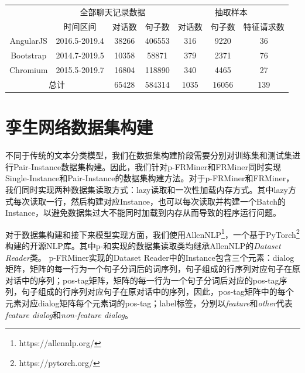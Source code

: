 \begin{table}[htbp]
    \label{tab:dataset}
    \centering
    \footnotesize%
    \setlength{\tabcolsep}{4pt}%
    \renewcommand{\arraystretch}{1.2}%
\begin{tabular}{|c|c|c|c|c|c|c|}
\hline
\multirow{}{}{} & \multicolumn{3}{c|}{全部聊天记录数据}    & \multicolumn{3}{c|}{抽取样本} \\ \cline{2-7} 
                  & 时间区间          & 对话数   & 句子数    & 对话数    & 句子数     & 特征请求数  \\ \hline
AngularJS         & 2016.5-2019.4 & 38266 & 406553 & 316    & 9220    & 36     \\ \hline
Bootstrap         & 2014.7-2019.5 & 10358 & 58871  & 379    & 2371    & 76     \\ \hline
Chromium          & 2015.5-2019.7 & 16804 & 118890 & 340    & 4465    & 27     \\ \hline
\multicolumn{2}{|c|}{总计}          & 65428 & 584314 & 1035   & 16056   & 139    \\ \hline
\end{tabular}
\end{table}
\section{孪生网络数据集构建}

不同于传统的文本分类模型，我们在数据集构建阶段需要分别对训练集和测试集进行Pair-Instance数据集构建。因此，我们针对p-FRMiner和FRMiner同时实现Single-Instance和Pair-Instance的数据集构建方法。对于p-FRMiner和FRMiner，我们同时实现两种数据集读取方式：lazy读取和一次性加载内存方式。其中lazy方式每次读取一行，然后构建对应Instance，也可以每次读取并构建一个Batch的Instance，以避免数据集过大不能同时加载到内存从而导致的程序运行问题。

对于数据集构建和接下来模型实现方面，我们使用AllenNLP\footnote{https://allennlp.org/}，一个基于PyTorch\footnote{https://pytorch.org/}构建的开源NLP库。其中p-{\tool}和{\tool}实现的数据集读取类均继承AllenNLP的\textit{Dataset Reader}类。
p-FRMiner实现的Dataset Reader中的Instance包含三个元素：dialog矩阵，矩阵的每一行为一个句子分词后的词序列，句子组成的行序列对应句子在原对话中的序列；pos-tag矩阵，矩阵的每一行为一个句子分词后对应的pos-tag序列，句子组成的行序列对应句子在原对话中的序列，因此，pos-tag矩阵中的每个元素对应dialog矩阵每个元素词的pos-tag；label标签，分别以\textit{feature}和\textit{other}代表\textit{feature dialog}和\textit{non-feature dialog}。

